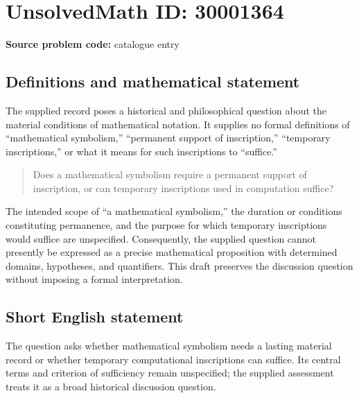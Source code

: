\documentclass[11pt]{article}
\begin{document}
\section*{UnsolvedMath ID: 30001364}
\textbf{Source problem code:} catalogue entry
\subsection{Definitions and mathematical statement}
The supplied record poses a historical and philosophical question about the material conditions of mathematical notation. It supplies no formal definitions of ``mathematical symbolism,'' ``permanent support of inscription,'' ``temporary inscriptions,'' or what it means for such inscriptions to ``suffice.''

\begin{quote}
Does a mathematical symbolism require a permanent support of inscription, or can temporary inscriptions used in computation suffice?
\end{quote}

The intended scope of ``a mathematical symbolism,'' the duration or conditions constituting permanence, and the purpose for which temporary inscriptions would suffice are unspecified. Consequently, the supplied question cannot presently be expressed as a precise mathematical proposition with determined domains, hypotheses, and quantifiers. This draft preserves the discussion question without imposing a formal interpretation.
\subsection{Short English statement}
The question asks whether mathematical symbolism needs a lasting material record or whether temporary computational inscriptions can suffice. Its central terms and criterion of sufficiency remain unspecified; the supplied assessment treats it as a broad historical discussion question.
\end{document}
